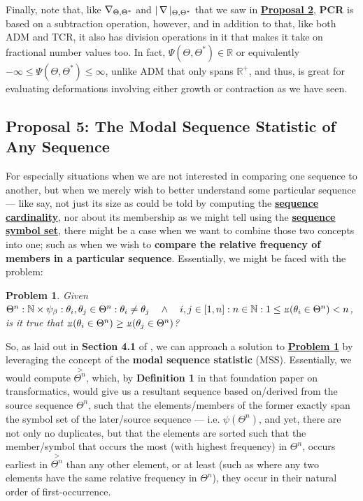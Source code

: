 \documentclass[a4paper, 18pt]{book} %
\newcommand{\invdel}[1]{\mathop{\rotatebox[origin=c]{180}{$\Delta$}}#1}
\newtheorem{prob}{Problem}
\newcommand{\invpi}{\rotatebox[origin=c]{180}{$\pi$}}
\begin{document}
Finally, note that, like $\invdel_{\Theta,\Theta^*}$ and $|\invdel|_{\Theta,\Theta^*}$ that we saw in \textbf{\hyperref[PROP2]{Proposal 2}}, \textbf{PCR} is based on a subtraction operation, however, and in addition to that, like both ADM and TCR, it also has division operations in it that makes it take on fractional number\cite{Lutalo2024gtnc} values too. In fact, $\Psi(\Theta,\Theta^*) \in \mathbb{R}$ or equivalently  $-\infty \leq \Psi(\Theta,\Theta^*) \leq \infty$, unlike ADM that only spans $\mathbb{R^+}$, and thus, is great for evaluating deformations involving either growth or contraction as we have seen. 


\subsection{Proposal 5: The Modal Sequence Statistic of Any Sequence\cite{transformatics}}
\label{PROP5}


For especially situations when we are not interested in comparing one sequence to another, but when we merely wish to better understand some particular sequence --- like say, not just its size as could be told by computing the \textbf{\hyperref[RES4]{sequence cardinality}}, nor about its membership as we might tell using the \textbf{\hyperref[RES5]{sequence symbol set}}, there might be a case when we want to combine those two concepts into one; such as when we wish to \textbf{compare the relative frequency of members in a particular sequence}. Essentially, we might be faced with the problem:

\vspace{1em}
\begin{prob}
\label{PROB1b}
Given\\ $\Theta^n : \mathbb{N} \times \psi_\beta : \theta_i, \theta_j \in \Theta^n : \theta_i \neq \theta_j  \quad \land \quad i,j \in [1,n] : n \in \mathbb{N}: 1 \leq \invpi(\theta_i \in \Theta^n) < n$,\\ is it true that $\invpi(\theta_i \in \Theta^n) \geq \invpi(\theta_j \in \Theta^n)$?
\end{prob}
\vspace{1em}

So, as laid out in \textbf{Section 4.1} of \cite{transformatics}, we can approach a solution to \textbf{\hyperref[PROB1b]{Problem \ref{PROB1b}}} by leveraging the concept of the \textbf{modal sequence statistic} (MSS). Essentially, we would compute $\overset{>}{\Theta^n}$, which, by \textbf{Definition 1} in that foundation paper on transformatics\cite{transformatics}, would give us a resultant sequence based on/derived from the source sequence $\Theta^n$, such that the elements/members of the former exactly span the symbol set of the later/source sequence --- i.e. $\psi(\Theta^n)$, and yet, there are not only no duplicates, but that the elements are sorted such that the member/symbol that occurs the most (with highest frequency) in $\Theta^n$, occurs earliest in  $\overset{>}{\Theta^n}$ than any other element, or at least (such as where any two elements have the same relative frequency in $\Theta^n$), they occur in their natural order of first-occurrence.
\end{document}
